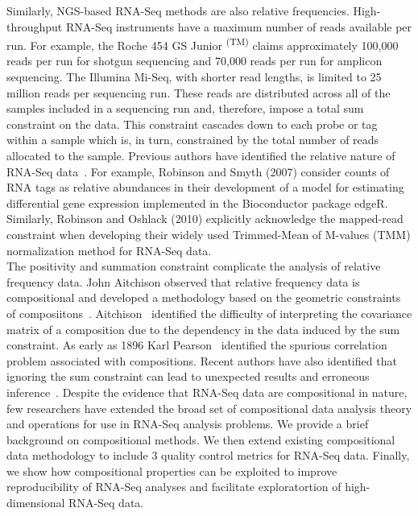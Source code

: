 \documentclass{article}\usepackage[]{graphicx}\usepackage[]{color}
\begin{document}
Similarly, NGS-based RNA-Seq methods are also relative frequencies.  High-throughput RNA-Seq instruments have a maximum number of reads available per run.  For example, the Roche 454 GS Junior \textsuperscript{(TM)} claims approximately 100,000 reads per run for shotgun sequencing and 70,000 reads per run for amplicon sequencing.  The Illumina Mi-Seq, with shorter read lengths, is limited to 25 million reads per sequencing run.  These reads are distributed across all of the samples included in a sequencing run and, therefore, impose a total sum constraint on the data.  This constraint cascades down to each probe or tag within a sample which is, in turn, constrained by the total number of reads allocated to the sample.  Previous authors have identified the relative nature of RNA-Seq data~\cite{Robinson2007, Anders2010, Robinson2010, Law2014, Lovell2015}.  For example, Robinson and Smyth (2007) consider counts of RNA tags as relative abundances in their development of a model for estimating differential gene expression implemented in the Bioconductor package edgeR.  Similarly, Robinson and Oshlack (2010) explicitly acknowledge the mapped-read constraint when developing their widely used Trimmed-Mean of M-values (TMM) normalization method for RNA-Seq data.  \\%

The positivity and summation constraint complicate the analysis of relative frequency data.  John Aitchison observed that relative frequency data is compositional and developed a methodology based on the geometric constraints of composiitons~\cite{Aitchison1986}.  Aitchison~\cite{Aitchison1986} identified the difficulty of interpreting the covariance matrix of a composition due to the dependency in the data induced by the sum constraint.  As early as 1896 Karl Pearson~\cite{Pearson1896} identified the spurious correlation problem associated with compositions.  Recent authors have also identified that ignoring the sum constraint can lead to unexpected results and erroneous inference~\cite{Lovell2011}.  Despite the evidence that RNA-Seq data are compositional in nature, few researchers have extended the broad set of compositional data analysis theory and operations for use in RNA-Seq analysis problems.  We provide a brief background on compositional methods.  We then extend existing compositional data methodology to include 3 quality control metrics for RNA-Seq data. Finally, we show how compositional properties can be exploited to improve reproducibility of RNA-Seq analyses and facilitate exploratortion of high-dimensional RNA-Seq data.\\
\end{document}
